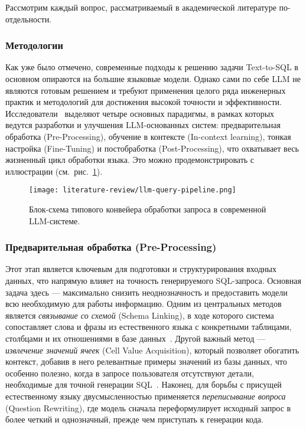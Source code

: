 \noindent Рассмотрим каждый вопрос, рассматриваемый в академической литературе по-отдельности.

\subsubsection{Методологии}

Как уже было отмечено, современные подходы к решению задачи Text-to-SQL в основном опираются
на большие языковые модели. Однако сами по себе LLM не являются готовым решением и
требуют применения целого ряда инженерных практик и методологий для достижения
высокой точности и эффективности. Исследователи~\cite{huangExploringLandscapeTexttoSQL2025}
выделяют четыре основных парадигмы, в рамках которых ведутся разработки и улучшения
LLM-основанных систем: предварительная обработка (Pre-Processing),
обучение в контексте (In-context learning), тонкая настройка (Fine-Tuning) и
постобработка (Post-Processing), что охватывает весь жизненный цикл обработки языка.
Это можно продемонстрировать с иллюстрации (см.~рис.~\ref{fig:llm-query-pipeline}).

\begin{figure}[!ht]
      \centering
      \texttt{[image: literature-review/llm-query-pipeline.png]}
      \caption{Блок-схема типового конвейера обработки запроса в современной LLM-системе.}
      \label{fig:llm-query-pipeline}
\end{figure}


\subsubsection{Предварительная обработка (Pre-Processing)}

Этот этап является ключевым
для подготовки и структурирования входных данных, что напрямую влияет на точность
генерируемого SQL-запроса. Основная задача здесь --- максимально снизить неоднозначность
и предоставить модели всю необходимую для работы информацию.
Одним из центральных методов является \textit{связывание со схемой} (Schema Linking), в
ходе которого система сопоставляет слова и фразы из естественного языка с конкретными таблицами,
столбцами и их отношениями в базе данных~\cite{huangExploringLandscapeTexttoSQL2025,
      mohammadjafariNaturalLanguageSQL2025}. Другой важный метод --- \textit{извлечение значений ячеек}
(Cell Value Acquisition), который позволяет обогатить контекст, добавив в него
релевантные примеры значений из базы данных, что особенно полезно, когда в запросе
пользователя отсутствуют детали, необходимые для точной генерации
SQL~\cite{huangExploringLandscapeTexttoSQL2025}. Наконец, для борьбы с присущей
естественному языку двусмысленностью применяется \textit{переписывание вопроса}
(Question Rewriting), где модель сначала переформулирует исходный запрос в более
четкий и однозначный, прежде чем приступать к генерации кода.

